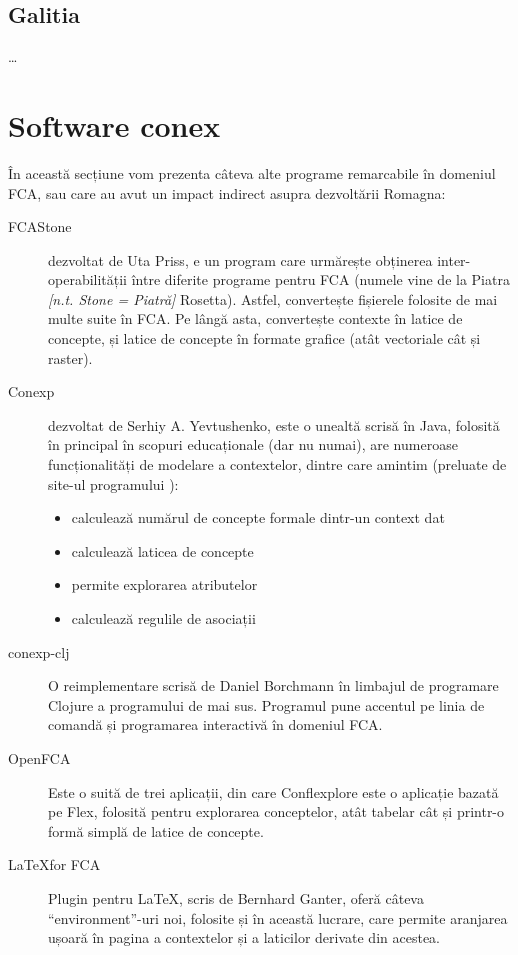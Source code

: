 \documentclass[12pt, a4paper, twoside, romanian]{teza-upb}
\begin{document}
    \subsection{Galitia}
    \ldots %
  \section{Software conex}

    În această secțiune vom prezenta câteva alte programe remarcabile în domeniul FCA, sau care au avut un impact indirect asupra dezvoltării Romagna:
    \begin{description}
      \item[FCAStone] dezvoltat de Uta Priss, e un program care urmărește obținerea inter-operabilității între diferite programe pentru FCA (numele vine de la Piatra \textit{[n.t. Stone = Piatră]} Rosetta). Astfel, convertește fișierele folosite de mai multe suite în FCA. Pe lângă asta, convertește contexte în latice de concepte, și latice de concepte în formate grafice (atât vectoriale cât și raster).
      \item[Conexp] dezvoltat de Serhiy A. Yevtushenko, este o unealtă scrisă în Java, folosită în principal în scopuri educaționale (dar nu numai), are numeroase funcționalități de modelare a contextelor, dintre care amintim (preluate de site-ul programului \cite{conexp:users}):
        \begin{itemize}
            \item calculează numărul de concepte formale dintr-un context dat
            \item calculează laticea de concepte
            \item permite explorarea atributelor
            \item calculează regulile de asociații
        \end{itemize}
      \item[conexp-clj] O reimplementare scrisă de Daniel Borchmann în limbajul de programare Clojure a programului de mai sus. Programul pune accentul pe linia de comandă și programarea interactivă în domeniul FCA.
      \item[OpenFCA] Este o suită de trei aplicații, din care Conflexplore este o aplicație bazată pe Flex, folosită pentru explorarea conceptelor, atât tabelar cât și printr-o formă simplă de latice de concepte.  
      \item[\LaTeX for FCA] \cite{LatexForFCA:homepage} Plugin pentru \LaTeX, scris de Bernhard Ganter, oferă câteva ``environment''-uri noi, folosite și în această lucrare, care permite aranjarea ușoară în pagina a contextelor și a laticilor derivate din acestea.
    \end{description}
\end{document}
